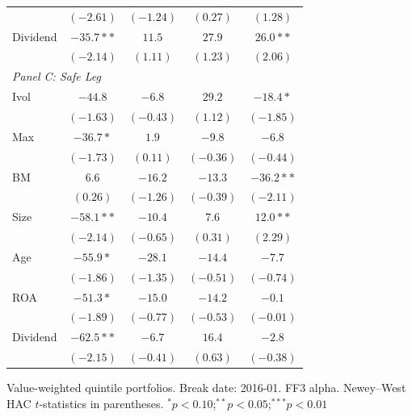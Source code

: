\begin{tabular}{l c c c c}
 & $(-2.61)$ & $(-1.24)$ & $(0.27)$ & $(1.28)$ \\
Dividend & $-35.7**$ & $11.5$ & $27.9$ & $26.0**$ \\
 & $(-2.14)$ & $(1.11)$ & $(1.23)$ & $(2.06)$ \\
\midrule
\multicolumn{5}{l}{\textit{Panel C: Safe Leg}} \\
Ivol & $-44.8$ & $-6.8$ & $29.2$ & $-18.4*$ \\
 & $(-1.63)$ & $(-0.43)$ & $(1.12)$ & $(-1.85)$ \\
Max & $-36.7*$ & $1.9$ & $-9.8$ & $-6.8$ \\
 & $(-1.73)$ & $(0.11)$ & $(-0.36)$ & $(-0.44)$ \\
BM & $6.6$ & $-16.2$ & $-13.3$ & $-36.2**$ \\
 & $(0.26)$ & $(-1.26)$ & $(-0.39)$ & $(-2.11)$ \\
Size & $-58.1**$ & $-10.4$ & $7.6$ & $12.0**$ \\
 & $(-2.14)$ & $(-0.65)$ & $(0.31)$ & $(2.29)$ \\
Age & $-55.9*$ & $-28.1$ & $-14.4$ & $-7.7$ \\
 & $(-1.86)$ & $(-1.35)$ & $(-0.51)$ & $(-0.74)$ \\
ROA & $-51.3*$ & $-15.0$ & $-14.2$ & $-0.1$ \\
 & $(-1.89)$ & $(-0.77)$ & $(-0.53)$ & $(-0.01)$ \\
Dividend & $-62.5**$ & $-6.7$ & $16.4$ & $-2.8$ \\
 & $(-2.15)$ & $(-0.41)$ & $(0.63)$ & $(-0.38)$ \\
\bottomrule
\end{tabular}
\vspace{4pt}
\begin{minipage}{0.9\textwidth}
\footnotesize
Value-weighted quintile portfolios. Break date: 2016-01. FF3 alpha.
Newey--West HAC $t$-statistics in parentheses.
$^{*}p<0.10$;\quad $^{**}p<0.05$;\quad $^{***}p<0.01$
\end{minipage}